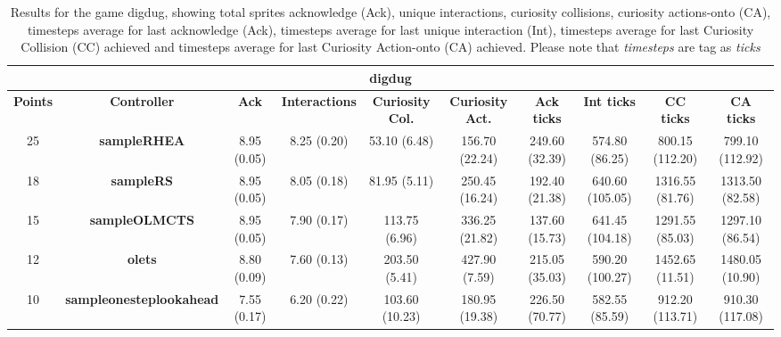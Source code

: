 \begin{table*}[!t]
\begin{center}
\begin{adjustbox}{width=1\textwidth}
\begin{tabular}{|c|c|c|c|c|c|c|c|c|c|}
\multicolumn{10}{c}{\textbf{digdug}}\\
\hline
\textbf{Points} & \textbf{Controller} & \textbf{Ack} & \textbf{Interactions} & \textbf{Curiosity Col.} & \textbf{Curiosity Act.} & \textbf{Ack ticks} & \textbf{Int ticks} & \textbf{CC ticks} & \textbf{CA ticks}\\
\hline
25 & \textbf{sampleRHEA} & 8.95 (0.05) & 8.25 (0.20) & 53.10 (6.48) & 156.70 (22.24) & 249.60 (32.39) & 574.80 (86.25) & 800.15 (112.20) & 799.10 (112.92)
 \\
\hline
18 & \textbf{sampleRS} & 8.95 (0.05) & 8.05 (0.18) & 81.95 (5.11) & 250.45 (16.24) & 192.40 (21.38) & 640.60 (105.05) & 1316.55 (81.76) & 1313.50 (82.58)
 \\
\hline
15 & \textbf{sampleOLMCTS} & 8.95 (0.05) & 7.90 (0.17) & 113.75 (6.96) & 336.25 (21.82) & 137.60 (15.73) & 641.45 (104.18) & 1291.55 (85.03) & 1297.10 (86.54)
 \\
\hline
12 & \textbf{olets} & 8.80 (0.09) & 7.60 (0.13) & 203.50 (5.41) & 427.90 (7.59) & 215.05 (35.03) & 590.20 (100.27) & 1452.65 (11.51) & 1480.05 (10.90)
 \\
\hline
10 & \textbf{sampleonesteplookahead} & 7.55 (0.17) & 6.20 (0.22) & 103.60 (10.23) & 180.95 (19.38) & 226.50 (70.77) & 582.55 (85.59) & 912.20 (113.71) & 910.30 (117.08)
 \\
\hline
\end{tabular}
\end{adjustbox}
\caption{Results for the game digdug, showing total sprites acknowledge (Ack), unique interactions, curiosity collisions, curiosity actions-onto (CA), timesteps average for last acknowledge (Ack),  timesteps average for last unique interaction (Int), timesteps average for last Curiosity Collision (CC) achieved and timesteps average for last Curiosity Action-onto (CA) achieved. Please note that \textit{timesteps} are tag as \textit{ticks}}
\label{tab:weights}
\end{center}
\end{table*}
